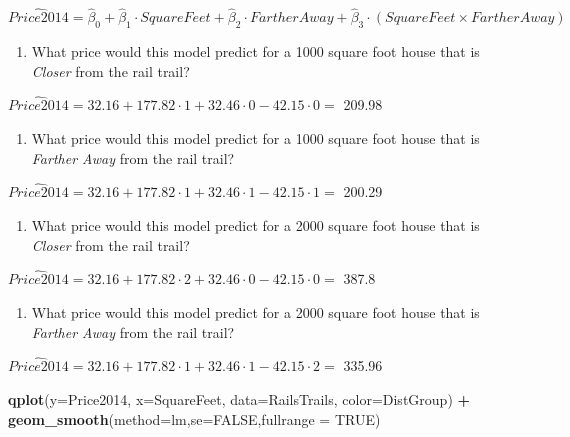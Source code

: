 \documentclass[]{article}
\newenvironment{Shaded}{\begin{snugshade}}{\end{snugshade}}
\newcommand{\DataTypeTok}[1]{\textcolor[rgb]{0.13,0.29,0.53}{#1}}
\newcommand{\KeywordTok}[1]{\textcolor[rgb]{0.13,0.29,0.53}{\textbf{#1}}}
\newcommand{\NormalTok}[1]{#1}
\newcommand{\OperatorTok}[1]{\textcolor[rgb]{0.81,0.36,0.00}{\textbf{#1}}}
\newcommand{\OtherTok}[1]{\textcolor[rgb]{0.56,0.35,0.01}{#1}}
\newcommand{\StringTok}[1]{\textcolor[rgb]{0.31,0.60,0.02}{#1}}
\providecommand{\tightlist}{%
  \setlength{\itemsep}{0pt}\setlength{\parskip}{0pt}}
\begin{document}
\textbf{\[\widehat{Price2014} = \hat{\beta}_0 + \hat{\beta}_1 \cdot SquareFeet + \hat{\beta}_2 \cdot FartherAway + \hat{\beta}_3 \cdot (SquareFeet \times FartherAway)\]}

\begin{enumerate}
\def\labelenumi{\arabic{enumi}.}
\setcounter{enumi}{10}
\tightlist
\item
  What price would this model predict for a 1000 square foot house that
  is \emph{Closer} from the rail trail?
\end{enumerate}

\(\widehat{Price2014} = 32.16 + 177.82 \cdot 1 + 32.46 \cdot 0 - 42.15 \cdot 0=\)
209.98

\begin{enumerate}
\def\labelenumi{\arabic{enumi}.}
\setcounter{enumi}{11}
\tightlist
\item
  What price would this model predict for a 1000 square foot house that
  is \emph{Farther Away} from the rail trail?
\end{enumerate}

\(\widehat{Price2014} = 32.16 + 177.82 \cdot 1 + 32.46 \cdot 1 - 42.15 \cdot 1=\)
200.29

\begin{enumerate}
\def\labelenumi{\arabic{enumi}.}
\setcounter{enumi}{12}
\tightlist
\item
  What price would this model predict for a 2000 square foot house that
  is \emph{Closer} from the rail trail?
\end{enumerate}

\(\widehat{Price2014} = 32.16 + 177.82 \cdot 2 + 32.46 \cdot 0 - 42.15 \cdot 0=\)
387.8

\begin{enumerate}
\def\labelenumi{\arabic{enumi}.}
\setcounter{enumi}{13}
\tightlist
\item
  What price would this model predict for a 2000 square foot house that
  is \emph{Farther Away} from the rail trail?
\end{enumerate}

\(\widehat{Price2014} = 32.16 + 177.82 \cdot 1 + 32.46 \cdot 1 - 42.15 \cdot 2=\)
335.96

\newpage

\begin{Shaded}
\begin{Highlighting}[]
\KeywordTok{qplot}\NormalTok{(}\DataTypeTok{y=}\NormalTok{Price2014, }\DataTypeTok{x=}\NormalTok{SquareFeet, }\DataTypeTok{data=}\NormalTok{RailsTrails, }\DataTypeTok{color=}\NormalTok{DistGroup) }\OperatorTok{+}\StringTok{ }
\StringTok{  }\KeywordTok{geom_smooth}\NormalTok{(}\DataTypeTok{method=}\NormalTok{lm,}\DataTypeTok{se=}\OtherTok{FALSE}\NormalTok{,}\DataTypeTok{fullrange =} \OtherTok{TRUE}\NormalTok{)}
\end{Highlighting}
\end{Shaded}
\end{document}
